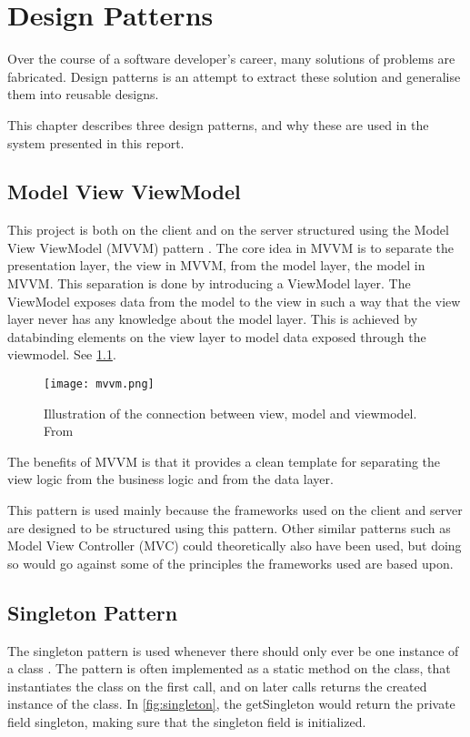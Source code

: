 \chapter{Design Patterns}

Over the course of a software developer's career, many solutions of
problems are fabricated. Design patterns is an attempt to extract these solution
and generalise them into reusable designs.

This chapter describes three design patterns, and why these are used
in the system presented in this report.

\section{Model View ViewModel}

This project is both on the client and on the server structured using
the Model View ViewModel (MVVM) pattern \cite{mvvm}. The core idea in MVVM is to
separate the presentation layer, the view in MVVM, from the model
layer, the model in MVVM. This separation is done by introducing a
ViewModel layer. The ViewModel exposes data from the model to the view
in such a way that the view layer never has any knowledge about the
model layer. This is achieved by databinding elements on the view
layer to model data exposed through the viewmodel. See \cref{fig:mvvm}.

\begin{figure}
  \centering
  \texttt{[image: mvvm.png]}
  \caption{Illustration of the connection between view, model and
    viewmodel. From \cite{mvvm}}\label{fig:mvvm}
\end{figure}

The benefits of MVVM is that it provides a clean template for
separating the view logic from the business logic and from the data
layer.

This pattern is used mainly because the frameworks used on the client
and server are designed to be structured using this pattern. Other
similar patterns such as Model View Controller (MVC) could
theoretically also have been used, but doing so would go against some
of the principles the frameworks used are based upon.

\section{Singleton Pattern}

The singleton pattern is used whenever there should only ever be one
instance of a class \cite{skeet2013c}. The pattern is often implemented as a static
method on the class, that instantiates the class on the first call,
and on later calls returns the created instance of the class. In
\cref{fig:singleton}, the getSingleton would return the private field
singleton, making sure that the singleton field is initialized.


